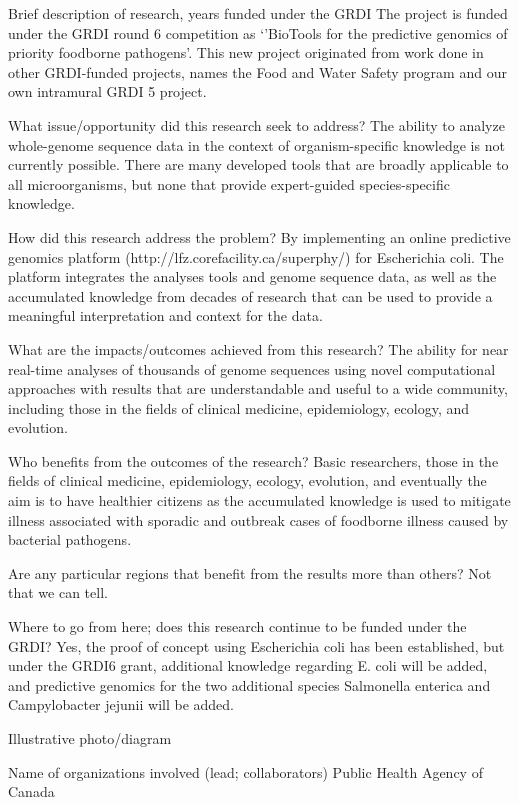 Brief description of research, years funded under the GRDI
The project is funded under the GRDI round 6 competition as `'BioTools for the predictive genomics of priority foodborne pathogens'. This new project originated from work done in other GRDI-funded projects, names the Food and Water Safety program and our own intramural GRDI 5 project.

What issue/opportunity did this research seek to address?
The ability to analyze whole-genome sequence data in the context of organism-specific knowledge is not currently possible.  There are many developed tools that are broadly applicable to all microorganisms, but none that provide expert-guided species-specific knowledge.

How did this research address the problem?
By implementing an online predictive genomics platform (http://lfz.corefacility.ca/superphy/) for Escherichia coli. The platform integrates the analyses tools and genome sequence data, as well as the accumulated knowledge from decades of research that can be used to provide a meaningful interpretation and context for the data. 

What are the impacts/outcomes achieved from this research?
The ability for near real-time analyses of thousands of genome sequences using novel computational approaches with results that are understandable and useful to a wide community, including those in the fields of clinical medicine, epidemiology, ecology, and evolution.

Who benefits from the outcomes of the research?
Basic researchers,  those in the fields of clinical medicine, epidemiology, ecology, evolution, and eventually the aim is to have healthier citizens as the accumulated knowledge is used to mitigate illness associated with sporadic and outbreak cases of foodborne illness caused by bacterial pathogens.

Are any particular regions that benefit from the results more than others?
Not that we can tell.

Where to go from here; does this research continue to be funded under the GRDI?
Yes, the proof of concept using Escherichia coli has been established, but under the GRDI6 grant, additional knowledge regarding E. coli will be added, and predictive genomics for the two additional species Salmonella enterica and Campylobacter jejunii will be added.

Illustrative photo/diagram




Name of organizations involved (lead; collaborators)    
Public Health Agency of Canada


